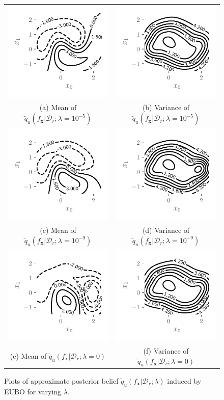 \documentclass{article}
\theoremstyle{definition}
\newcommand{\mbf}[1]{\mathbf{#1}}
\newcommand{\mcl}[1]{\mathcal{#1}}
\newcommand{\dc}{\mcl{D}_r}
\newcommand{\eubo}{\tilde{q}_u}
\begin{document}
\begin{figure}
\centering
\begin{tabular}{cc}
\includegraphics[trim={7mm 8mm 3mm 3mm}, clip,height=0.18\textwidth]{img/moon/moon_eubo_meanf_1e-05.pdf}
&
\includegraphics[trim={7mm 8mm 3mm 3mm}, clip,height=0.18\textwidth]{img/moon/moon_eubo_varf_1e-05.pdf}\\
(a) Mean of $\eubo(f_{\mbf{x}}|\dc; \lambda=10^{-5})$
&
(b) Variance of $\eubo(f_{\mbf{x}}|\dc; \lambda=10^{-5})$\\
\includegraphics[trim={7mm 8mm 3mm 3mm}, clip,height=0.18\textwidth]{img/moon/moon_eubo_meanf_1e-09.pdf}
&
\includegraphics[trim={7mm 8mm 3mm 3mm}, clip,height=0.18\textwidth]{img/moon/moon_eubo_varf_1e-09.pdf}\\
(c) Mean of $\eubo(f_{\mbf{x}}|\dc; \lambda=10^{-9})$
&
(d) Variance of $\eubo(f_{\mbf{x}}|\dc; \lambda=10^{-9})$\\
\includegraphics[trim={7mm 8mm 3mm 3mm}, clip,height=0.18\textwidth]{img/moon/moon_eubo_meanf_0_0.pdf}
&
\includegraphics[trim={7mm 8mm 3mm 3mm}, clip,height=0.18\textwidth]{img/moon/moon_eubo_varf_0_0.pdf}
\\
(e) Mean of $\eubo(f_{\mbf{x}}|\dc; \lambda=0)$
&
(f) Variance of $\eubo(f_{\mbf{x}}|\dc; \lambda=0)$
\end{tabular}
\caption{Plots of approximate posterior belief $\eubo(f_{\mbf{x}}|\dc;\lambda)$ induced by EUBO for varying $\lambda$.}
\label{fig:moonfullposteubo}
\end{figure}
\end{document}
